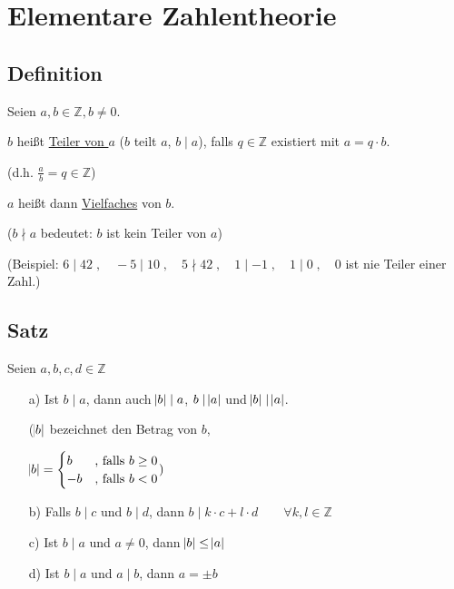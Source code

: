 \documentclass[a4paper, 12pt, twoside] {article}
\begin{document}
\section{Elementare Zahlentheorie} %

\subsection[Definition (Teiler und Vielfaches)]{Definition} %

Seien $a,b \in \mathbb{Z}, b \neq 0$.

$b$ heißt \underline{Teiler von $a$} ($b$ teilt $a$, $b \mid a$), falls $q \in \mathbb{Z}$ existiert mit $a = q \cdot b$.

(d.h. $\frac{a}{b}= q \in \mathbb{Z}$)

$a$ heißt dann \underline{Vielfaches} von $b$.

($b \nmid a$ bedeutet: $b$ ist kein Teiler von $a$)

(Beispiel: $6 \mid 42 \;, \quad -5 \mid 10 \;, \quad 5 \nmid 42 \;, \quad 1 \mid -1 \;, \quad 1 \mid 0 \;, \quad 0$ ist nie Teiler einer Zahl.)

\subsection[Satz (Betrag, Eigenschaften von Teiler und Vielfachem)]{Satz} %

Seien $a,b,c,d \in \mathbb{Z}$

\begin{itemize}

\item[a)] Ist $b \mid a$, dann auch $\abs{b} \mid a$, $b \mid \abs{a}$ und $\abs{b} \mid \abs{a}$.

($\abs{b}$ bezeichnet den Betrag von $b$,

$\abs{b} = \begin{cases}
b & \text{, falls } b \geq 0 \\
-b & \text{, falls }  b < 0
\end{cases} )$

\item[b)] Falls $b \mid c$ und $b \mid d$, dann $b \mid k \cdot c + l \cdot d \qquad \forall k,l \in \mathbb{Z}$

\item[c)] Ist $b \mid a$ und $a \neq 0$, dann $\abs{b} \leq \abs{a}$

\item[d)] Ist $b \mid a$ und $a \mid b$, dann $a = \pm b$

\end{itemize}
\end{document}
